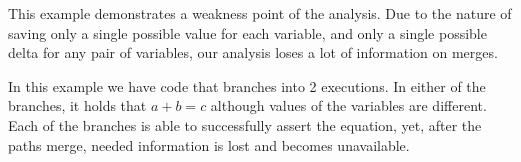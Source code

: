 This example demonstrates a weakness point of the analysis. Due to the nature of saving only a single possible value for each variable, and only a single possible delta for any pair of variables, our analysis loses a lot of information on merges.

In this example we have code that branches into 2 executions. In either of the branches, it holds that $a + b = c$ although values of the variables are different. Each of the branches is able to successfully assert the equation, yet, after the paths merge, needed information is lost and becomes unavailable.